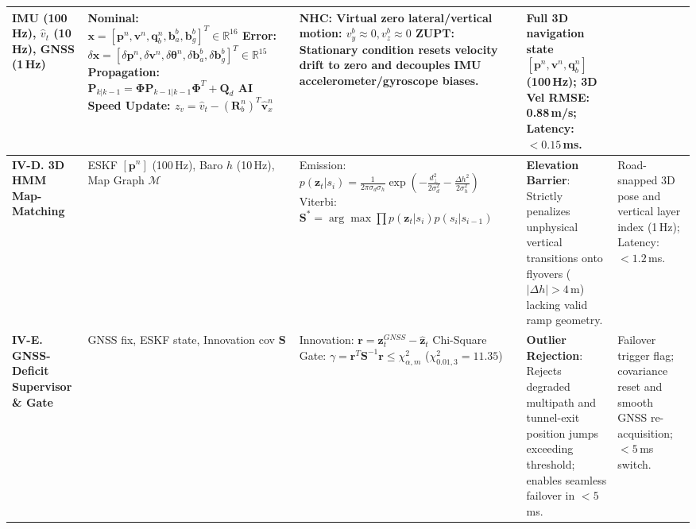 \documentclass[conference]{IEEEtran}
\begin{document}
\begin{table}[t]
{\begin{tabular}{|p{2.5cm}|p{2.2cm}|p{6.5cm}|p{4.3cm}|p{3.0cm}|}
IMU (100\,Hz), \newline
$\hat{v}_t$ (10\,Hz), \newline
GNSS (1\,Hz) & 
Nominal: $\mathbf{x} = [\mathbf{p}^n, \mathbf{v}^n, \mathbf{q}_b^n, \mathbf{b}_a^b, \mathbf{b}_g^b]^T \in \mathbb{R}^{16}$ \newline
Error: $\delta\mathbf{x} = [\delta\mathbf{p}^n, \delta\mathbf{v}^n, \delta\boldsymbol{\theta}^n, \delta\mathbf{b}_a^b, \delta\mathbf{b}_g^b]^T \in \mathbb{R}^{15}$ \newline
Propagation: $\mathbf{P}_{k|k-1} = \boldsymbol{\Phi}\mathbf{P}_{k-1|k-1}\boldsymbol{\Phi}^T + \mathbf{Q}_d$ \newline
AI Speed Update: $z_v = \hat{v}_t - (\mathbf{R}_b^n)^T \hat{\mathbf{v}}_x^n$ & 
\textbf{NHC}: Virtual zero lateral/vertical motion: $v_y^b \approx 0, v_z^b \approx 0$ \newline
\textbf{ZUPT}: Stationary condition resets velocity drift to zero and decouples IMU accelerometer/gyroscope biases. & 
Full 3D navigation state $[\mathbf{p}^n, \mathbf{v}^n, \mathbf{q}_b^n]$ (100\,Hz); \newline
3D Vel RMSE: 0.88\,m/s; \newline
Latency: $<0.15$\,ms. \\
\hline
\textbf{IV-D. 3D HMM Map-Matching} & 
ESKF $[\mathbf{p}^n]$ (100\,Hz), \newline
Baro $h$ (10\,Hz), \newline
Map Graph $\mathcal{M}$ & 
Emission: $p(\mathbf{z}_t|s_i) = \frac{1}{2\pi\sigma_d\sigma_h}\exp\left(-\frac{d_{\perp}^2}{2\sigma_d^2} - \frac{\Delta h^2}{2\sigma_h^2}\right)$ \newline
Viterbi: $\mathbf{S}^* = \arg\max \prod p(\mathbf{z}_t|s_i)p(s_i|s_{i-1})$ & 
\textbf{Elevation Barrier}: Strictly penalizes unphysical vertical transitions onto flyovers ($|\Delta h| > 4$\,m) lacking valid ramp geometry. & 
Road-snapped 3D pose and vertical layer index (1\,Hz); \newline
Latency: $<1.2$\,ms. \\
\hline
\textbf{IV-E. GNSS-Deficit Supervisor \& Gate} & 
GNSS fix, ESKF state, \newline
Innovation cov $\mathbf{S}$ & 
Innovation: $\mathbf{r} = \mathbf{z}_t^{GNSS} - \hat{\mathbf{z}}_t$ \newline
Chi-Square Gate: $\gamma = \mathbf{r}^T\mathbf{S}^{-1}\mathbf{r} \leq \chi^2_{\alpha, m}$ ($\chi^2_{0.01, 3} = 11.35$) & 
\textbf{Outlier Rejection}: Rejects degraded multipath and tunnel-exit position jumps exceeding threshold; enables seamless failover in $<5$\,ms. & 
Failover trigger flag; covariance reset and smooth GNSS re-acquisition; $<5$\,ms switch. \\
\hline
\end{tabular}%
}
\end{table}
\end{document}
